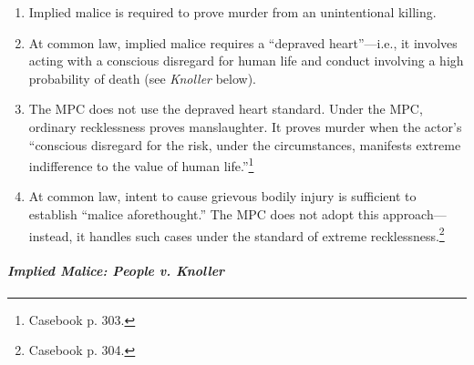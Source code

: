 \begin{enumerate}
    \item Implied malice is required to prove murder from an unintentional killing.
    \item At common law, implied malice requires a ``depraved heart''---i.e., it involves acting with a conscious disregard for human life and conduct involving a high probability of death (see \emph{Knoller} below).
    \item The MPC does not use the depraved heart standard. Under the MPC, ordinary recklessness proves manslaughter. It proves murder when the actor's ``conscious disregard for the risk, under the circumstances, manifests extreme indifference to the value of human life.''\footnote{Casebook p. 303.} 
    \item At common law, intent to cause grievous bodily injury is sufficient to establish ``malice aforethought.'' The MPC does not adopt this approach---instead, it handles such cases under the standard of extreme recklessness.\footnote{Casebook p. 304.}
\end{enumerate}

\paragraph{\emph{Implied Malice: People v. Knoller}}

